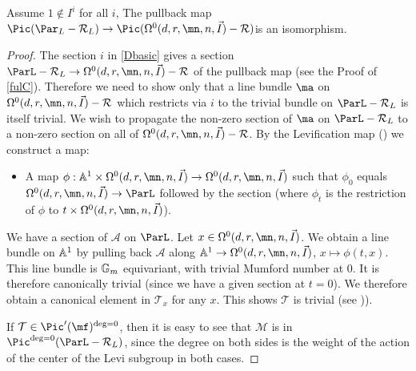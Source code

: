 \begin{lemma}
\notready\label{muchlater}
Assume $1\not\in I^i$ for all $i$,
The pullback map
$\Pic(\Par_L-\mathcal{R}_L)\to  \Pic({\Omega}^0(d,r,\mn,n,\vec{I})-\mathcal{R})$is an isomorphism.
\end{lemma}
\begin{proof}
The section $i$ in \eqref{Dbasic} gives a section $\ParL-\mathcal{R}_L\to {\Omega}^0(d,r,\mn,n,\vec{I})-\mathcal{R}$ of the pullback map (see the Proof of \eqref{fulC}). Therefore we need to show only that a line bundle $\ma$ on ${\Omega}^0(d,r,\mn,n,\vec{I})-\mathcal{R}$ which restricts via $i$ to the trivial bundle
on $\ParL-\mathcal{R}_L$ is itself trivial. We wish to propagate the non-zero section of $\ma$ on  $\ParL-\mathcal{R}_L$ to a non-zero section on all of ${\Omega}^0(d,r,\mn,n,\vec{I})-\mathcal{R}$.
By  the Levification map (\cite[Section 3.8]{BKq}) we construct a map:
\begin{itemize}
\item[-] A map $\phi:\Bbb{A}^1\times {\Omega}^0(d,r,\mn,n,\vec{I})\to \Omega^0(d,r,\mn,n,\vec{I})$ such that $\phi_0$ equals $\Omega^0(d,r,\mn,n,\vec{I})\to \ParL$ followed by the section (where $\phi_t$ is the restriction of $\phi$ to $t\times \Omega^0(d,r,\mn,n,\vec{I})$).
\end{itemize}

We have a section of $\mathcal{A}$ on $\ParL$. Let $x\in \Omega^0(d,r,\mn,n,\vec{I})$. We obtain a line bundle on $\Bbb{A}^1$ by pulling back  $\mathcal{A}$ along $\Bbb{A}^1\to \Omega^0(d,r,\mn,n,\vec{I})$, $x\mapsto \phi(t,x)$. This line bundle is $\Bbb{G}_m$ equivariant, with trivial Mumford number at $0$. It is therefore canonically trivial (since we have a given section at $t=0$). We therefore obtain a canonical element in $\mathcal{T}_x$ for any $x$. This shows $\mathcal{T}$ is trivial (see \cite[Lemma 8.6]{BHermit})).

If  $\mathcal{T}\in \Pic'(\mf)^{\deg=0}$, then it is easy to see that $\mathcal{M}$ is in $\Pic^{\deg=0}(\ParL -\mathcal{R}_L)$, since the degree on both sides is the weight of the action of the center of the Levi subgroup in both cases.
\end{proof}
